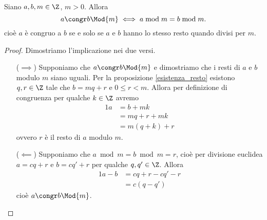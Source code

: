 \begin{theorem}  \label{equiv_congr_resto}
    Siano $a, b, m \in \Z$, $m > 0$. Allora
    \begin{equation}
        a \congr b \Mod{m} \iff a \bmod m = b \bmod m.
    \end{equation}
    cioè $a$ è congruo a $b$ se e solo se $a$ e $b$ hanno lo stesso resto quando divisi per $m$.
\end{theorem}
\begin{proof}
    Dimostriamo l'implicazione nei due versi.
    \begin{itemize}
        \item[($\implies$)]
        Supponiamo che $a \congr b \Mod{m}$ e dimostriamo che i resti di $a$ e $b$ modulo $m$ siano uguali.
        Per la proposizione \ref{esistenza_resto} esistono $q, r \in \Z$ tale che $b = mq + r$ e $0 \leq r < m$.
        Allora per definizione di congruenza per qualche $k \in \Z$ avremo
        \begin{alignat*}
            {1}
            a &= b + mk \\
            &= mq + r + mk \\
            &= m(q + k) + r
        \end{alignat*}
        ovvero $r$ è il resto di $a$ modulo $m$.
        \item[($\impliedby$)] Supponiamo che $a \bmod m = b \bmod m = r$, cioè per divisione euclidea $a = cq + r$ e $b = cq' + r$ per qualche $q, q' \in \Z$.  Allora
        \begin{alignat*}
            {1}
            a - b &= cq + r - cq' - r \\
                &= c(q - q')
        \end{alignat*}
        cioè $a \congr b \Mod{m}$. \qedhere
        \end{itemize}
\end{proof}


